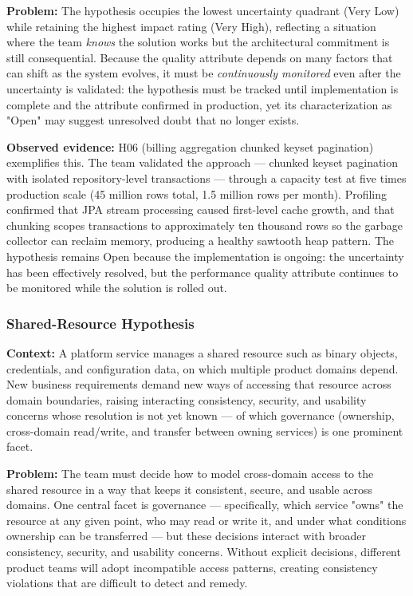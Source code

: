 \textbf{Problem:} The hypothesis occupies the lowest uncertainty quadrant
(Very Low) while retaining the highest impact rating (Very High), reflecting a
situation where the team \textit{knows} the solution works but the architectural
commitment is still consequential. Because the quality attribute depends on many
factors that can shift as the system evolves, it must be \textit{continuously
monitored} even after the uncertainty is validated: the hypothesis must be
tracked until implementation is complete and the attribute confirmed in
production, yet its characterization as "Open" may suggest unresolved doubt that
no longer exists.

\textbf{Observed evidence:} H06 (billing aggregation chunked keyset pagination)
exemplifies this. The team validated the approach — chunked keyset pagination
with isolated repository-level transactions — through a capacity test at five
times production scale (45 million rows total, 1.5 million rows per month).
Profiling confirmed that JPA stream processing caused first-level cache growth,
and that chunking scopes transactions to approximately ten thousand rows so the
garbage collector can reclaim memory, producing a healthy sawtooth heap pattern.
The hypothesis remains Open because the implementation is ongoing: the
uncertainty has been effectively resolved, but the performance quality attribute
continues to be monitored while the solution is rolled out.

\subsubsection{Shared-Resource Hypothesis}
\label{subsubsec:pattern-b5}
\textbf{Context:} A platform service manages a shared resource such as binary objects,
credentials, and configuration data, on which multiple product domains depend. New
business requirements demand new ways of accessing that resource across domain
boundaries, raising interacting consistency, security, and usability concerns
whose resolution is not yet known --- of which governance (ownership,
cross-domain read/write, and transfer between owning services) is one prominent
facet.

\textbf{Problem:} The team must decide how to model cross-domain access to the
shared resource in a way that keeps it consistent, secure, and usable across
domains. One central facet is governance --- specifically, which service "owns"
the resource at any given point, who may read or write it, and under what
conditions ownership can be transferred --- but these decisions interact with
broader consistency, security, and usability concerns. Without explicit
decisions, different product teams will adopt incompatible access patterns,
creating consistency violations that are difficult to detect and remedy.

